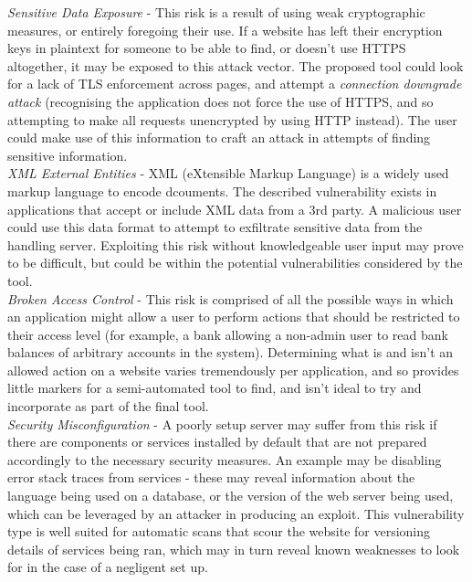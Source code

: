 	\emph{Sensitive Data Exposure} - This risk is a result of using weak cryptographic measures, or entirely foregoing their use. If a website has left their encryption keys in plaintext for someone to be able to find, or doesn't use HTTPS altogether, it may be exposed to this attack vector. The proposed tool could look for a lack of TLS enforcement across pages, and attempt a \textit{connection downgrade attack} (recognising the application does not force the use of HTTPS, and so attempting to make all requests unencrypted by using HTTP instead).  The user could make use of this information to craft an attack in attempts of finding sensitive information. \\
	
	\emph{XML External Entities} - XML (eXtensible Markup Language) is a widely used markup language to encode dcouments. The described vulnerability exists in applications that accept or include XML data from a 3rd party. A malicious user could use this data format to attempt to exfiltrate sensitive data from the handling server. Exploiting this risk without knowledgeable user input may prove to be difficult, but could be within the potential vulnerabilities considered by the tool. \\
	
	\emph{Broken Access Control} - This risk is comprised of all the possible ways in which an application might allow a user to perform actions that should be restricted to their access level (for example, a bank allowing a non-admin user to read bank balances of arbitrary accounts in the system). Determining what is and isn't an allowed action on a website varies tremendously per application, and so provides little markers for a semi-automated tool to find, and isn't ideal to try and incorporate as part of the final tool.   \\
	
	\emph{Security Misconfiguration} - A poorly setup server may suffer from this risk if there are components or services installed by default that are not prepared accordingly to the necessary security measures. An example may be disabling error stack traces from services - these may reveal information about the language being used on a database, or the version of the web server being used, which can be leveraged by an attacker in producing an exploit. This vulnerability type is well suited for automatic scans that scour the website for versioning details of services being ran, which may in turn reveal known weaknesses to look for in the case of a negligent set up.\\
	

